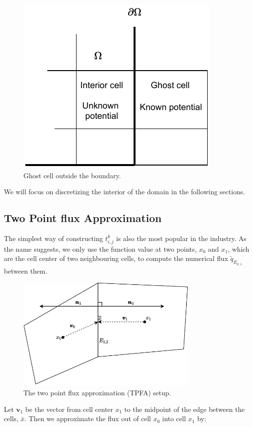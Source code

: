 \documentclass[../Main/main.tex]{subfiles}
\begin{document}
	\begin{figure}[H]
		\centering
		\includegraphics{ghostcell.pdf}
		\caption{Ghost cell outside the boundary.}
		\label{fig:ghost_cell}
	\end{figure}
	 We will focus on discretizing the interior of the domain in the following sections.
	\subsection{Two Point flux Approximation}
	The simplest way of constructing $t_{i,j}^k$ is also the most popular in the industry. As the name suggests, we only use the function value at two points, $x_{0}$ and $x_{1}$, which are the cell center of two neighbouring cells, to compute the numerical flux $\tilde{q}_{E_{0,1}}$ between them.
	\begin{figure}[H]
		\centering
		\includegraphics[width=0.8\textwidth]{two point (1).pdf}
		\caption{The two point flux approximation (TPFA) setup.}
		\label{fig:tpfa control volume}
	\end{figure}
	Let $\bm{v}_1$ be the vector from cell center $x_1$ to the midpoint of the edge between the cells, $\overline{x}$. Then we approximate the flux out of cell $x_0$ into cell $x_1$ by:
	
\end{document}
